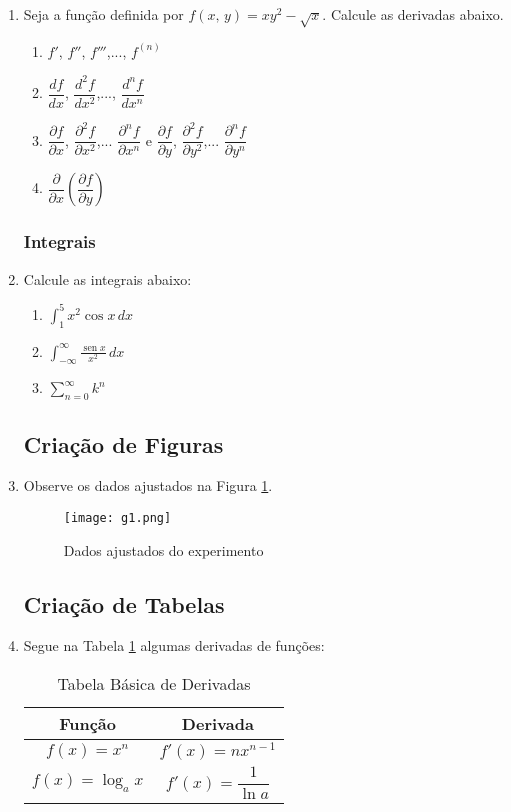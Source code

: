 \documentclass[a4paper,12pt]{article}
\DeclareMathOperator{\sen}{sen}
\newcommand{\integral}{\displaystyle\int}
\newcommand{\soma}{\displaystyle\sum}
\begin{document}
\begin{enumerate}
  \item Seja a função definida por $f(x,\,y) = xy^2 - \sqrt{x}$. Calcule
  as derivadas abaixo.
  \begin{enumerate}
   \item $f'$, $f''$, $f'''$,..., $f^{(n)}$
   \item $\dfrac{df}{dx}$, $\dfrac{d^2f}{dx^2}$,..., $\dfrac{d^nf}{dx^n}$
   \item $\dfrac{\partial f}{\partial x}$,
         $\dfrac{\partial^2f}{\partial x^2}$,...
         $\dfrac{\partial^nf}{\partial x^n}$ e
         $\dfrac{\partial f}{\partial y}$,
         $\dfrac{\partial^2f}{\partial y^2}$,...
         $\dfrac{\partial^nf}{\partial y^n}$
   \item $\dfrac{\partial}{\partial x}
         \left(\dfrac{\partial f}{\partial y}\right)$
  \end{enumerate}
  
\subsubsection{Integrais}  
  
  \item Calcule as integrais abaixo:
  \begin{enumerate}
   \item $\integral_1^5 x^2\cos x \, dx$
   \item $\integral_{-\infty}^{\infty} \frac{\sen x}{x^2} \, dx$
   \item $\soma_{n=0}^{\infty} k^n$
  \end{enumerate}
  
\subsection{Criação de Figuras}  
  
  \item Observe os dados ajustados na Figura \ref{meu_rotulo}.
  \begin{figure}[!htb]
   \centering
   \texttt{[image: g1.png]}
   \caption{Dados ajustados do experimento}
   \label{meu_rotulo}
  \end{figure}
  
\subsection{Criação de Tabelas}    
  
  \item Segue na Tabela \ref{tabela} algumas derivadas de funções:
  \begin{table}[!htb]
   \centering
    \begin{tabular}{|c||c|}
     \hline
     Função & Derivada \\ \hline
     $f(x) = x^n$ & $f'(x) = nx^{n-1}$ \\ \hline
     $f(x) = \log_a x$ & $f'(x) = \dfrac{1}{\ln a}$ \\ \hline
    \end{tabular}
    \caption{Tabela Básica de Derivadas}
    \label{tabela}
  \end{table}
  
\end{enumerate}
\end{document}
